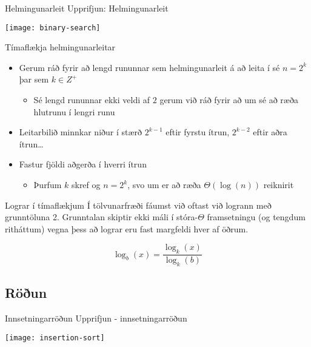 \documentclass[handout]{beamer}
\begin{document}
\begin{frame}{Helmingunarleit}
Upprifjun: Helmingunarleit

\begin{center}
\texttt{[image: binary-search]}
\end{center}
\end{frame}

\begin{frame}{Tímaflækja helmingunarleitar}
\begin{itemize}
 \item Gerum ráð fyrir að lengd rununnar sem helmingunarleit á að leita í sé $n = 2^k$ þar sem $k \in Z^+$
 \begin{itemize}
  \item Sé lengd rununnar ekki veldi af $2$ gerum við ráð fyrir að um sé að ræða hlutrunu í lengri runu 
 \end{itemize}
 \item Leitarbilið minnkar niður í stærð $2^{k-1}$ eftir fyrstu ítrun, $2^{k-2}$ eftir aðra ítrun\ldots
 \item Fastur fjöldi aðgerða í hverri ítrun \pause
 \begin{itemize}
  \item Þurfum $k$ skref og $n = 2^k$, svo um er að ræða $\Theta(\log(n))$ reiknirit
 \end{itemize}
\end{itemize}
\end{frame}

\begin{frame}{Lograr í tímaflækjum}
Í tölvunarfræði fáumst við oftast við logrann með grunntöluna 2. Grunntalan skiptir ekki máli í stóra-$\Theta$ framsetningu (og tengdum ritháttum) vegna þess að lograr eru fast margfeldi hver af öðrum.

\[
 \log_b(x) = \frac{\log_k(x)}{\log_k(b)}
\]

\end{frame}

\subsection{Röðun}

\begin{frame}{Innsetningarröðun}
Upprifjun - innsetningarröðun
\begin{center}
\texttt{[image: insertion-sort]}
\end{center}
\end{frame}
\end{document}

